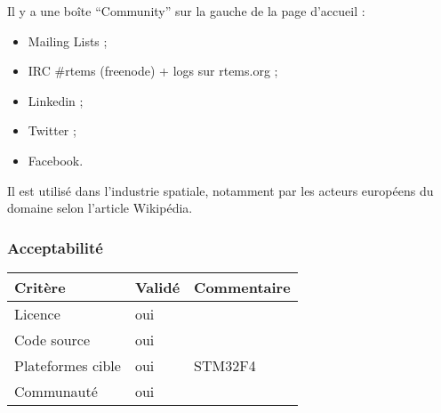 Il y a une boîte \enquote{Community} sur la gauche de la page d'accueil :
\begin{itemize}
	\item Mailing Lists ;
	\item IRC \#rtems (freenode) + logs sur rtems.org ;
	\item Linkedin ;
	\item Twitter ;
	\item Facebook.\\
\end{itemize}

Il est utilisé dans l'industrie spatiale, notamment par les acteurs européens du
domaine selon l'article Wikipédia.

\subsubsection{Acceptabilité}
\begin{tabular}{lll}
\toprule
	Critère				&	Validé		&	Commentaire	\\
\midrule
	Licence				&	oui			&		\\
	Code source			&	oui			&		\\
	Plateformes cible	&	oui			&	STM32F4	\\
	Communauté			&	oui			&		\\
\bottomrule
\end{tabular}

